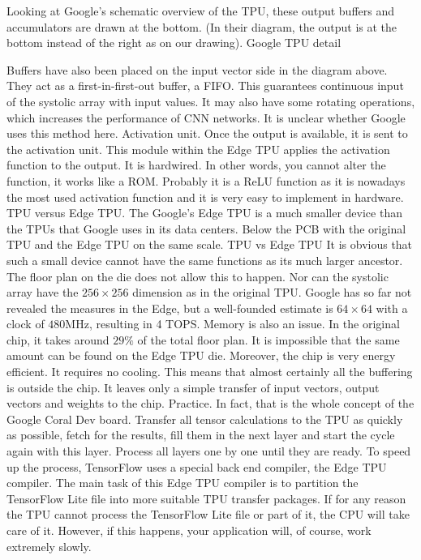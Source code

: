 %
%
Looking at Google's schematic overview of the TPU, these output buffers and
accumulators are drawn at the bottom. (In their diagram, the output is at the
bottom instead of the right as on our drawing).
Google TPU detail

  
Buffers have also been placed on the input vector side in the diagram above.
They act as a first-in-first-out buffer, a FIFO. This guarantees continuous
input of the systolic array with input values. It may also have some rotating
operations, which increases the performance of CNN networks. It is unclear
whether Google uses this method here.  
Activation unit.
Once the output is available, it is sent to the activation unit. This module within the Edge TPU applies the activation function to the output. It is hardwired. In other words, you cannot alter the function, it works like a ROM. Probably it is a ReLU function as it is nowadays the most used activation function and it is very easy to implement in hardware.  
TPU versus Edge TPU.
The Google's Edge TPU is a much smaller device than the TPUs that Google uses in its data centers. Below the PCB with the original TPU and the Edge TPU on the same scale.
TPU vs Edge TPU
It is obvious that such a small device cannot have the same functions as its much larger ancestor. The floor plan on the die does not allow this to happen. Nor can the systolic array have the $256 \times 256$ dimension as in the original TPU. Google has so far not revealed the measures in the Edge, but a well-founded estimate is $64 \times 64$ with a clock of $480 \si{\mega\hertz}$, resulting in 4 TOPS.
Memory is also an issue. In the original chip, it takes around $29\%$ of the total floor plan. It is impossible that the same amount can be found on the Edge TPU die. Moreover, the chip is very energy efficient. It requires no cooling. This means that almost certainly all the buffering is outside the chip. It leaves only a simple transfer of input vectors, output vectors and weights to the chip.  
Practice.
In fact, that is the whole concept of the Google Coral Dev board. Transfer all tensor calculations to the TPU as quickly as possible, fetch for the results, fill them in the next layer and start the cycle again with this layer. Process all layers one by one until they are ready.
To speed up the process, TensorFlow uses a special back end compiler, the Edge TPU compiler. The main task of this Edge TPU compiler is to partition the TensorFlow Lite file into more suitable TPU transfer packages. If for any reason the TPU cannot process the TensorFlow Lite file or part of it, the CPU will take care of it. However, if this happens, your application will, of course, work extremely slowly.
